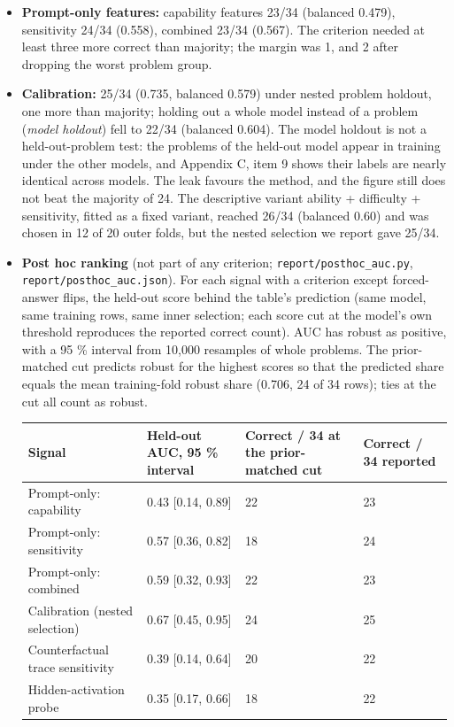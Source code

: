\documentclass{article}
\begin{document}
\begin{itemize}
\item
  \textbf{Prompt-only features:} capability features 23/34 (balanced 0.479), sensitivity 24/34 (0.558),
  combined 23/34 (0.567). The criterion needed at least three more correct than majority; the margin
  was \textminus{}1, and \textminus{}2 after dropping the worst problem group.
\item
  \textbf{Calibration:} 25/34 (0.735, balanced 0.579) under nested problem holdout, one more than
  majority; holding out a whole model instead of a problem (\emph{model holdout}) fell to 22/34 (balanced 0.604). The model holdout is not a
  held-out-problem test: the problems of the held-out model appear in training under the other
  models, and Appendix C, item 9 shows their labels are nearly identical across models. The leak favours the
  method, and the figure still does not beat the majority of 24. The descriptive variant
  ability + difficulty + sensitivity, fitted as a fixed variant, reached 26/34 (balanced 0.60) and was
  chosen in 12 of 20 outer folds, but the nested selection we report gave 25/34.
\item
  \textbf{Post hoc ranking} (not part of any criterion; \texttt{report/posthoc\_auc.py}, \texttt{report/posthoc\_auc.json}).
  For each signal with a criterion except forced-answer flips, the held-out score behind the table's
  prediction (same model, same training rows, same inner selection; each score cut at the model's own
  threshold reproduces the reported correct count). AUC has robust as positive, with a 95 \% interval
  from 10,000 resamples of whole problems. The prior-matched cut predicts robust for the highest
  scores so that the predicted share equals the mean training-fold robust share (0.706, 24 of 34
  rows); ties at the cut all count as robust.

\begin{center}
\small
\begin{tabular}{@{}p{4.2cm}p{2.6cm}R{2.2cm}R{2.0cm}@{}}
\toprule
Signal & Held-out AUC, 95 \% interval & Correct / 34 at the prior-matched cut & Correct / 34 reported \\
\midrule
Prompt-only: capability & 0.43 {[}0.14, 0.89{]} & 22 & 23 \\
  Prompt-only: sensitivity & 0.57 {[}0.36, 0.82{]} & 18 & 24 \\
  Prompt-only: combined & 0.59 {[}0.32, 0.93{]} & 22 & 23 \\
  Calibration (nested selection) & 0.67 {[}0.45, 0.95{]} & 24 & 25 \\
  Counterfactual trace sensitivity & 0.39 {[}0.14, 0.64{]} & 20 & 22 \\
  Hidden-activation probe & 0.35 {[}0.17, 0.66{]} & 18 & 22 \\
\bottomrule
\end{tabular}
\end{center}


\end{itemize}
\end{document}
